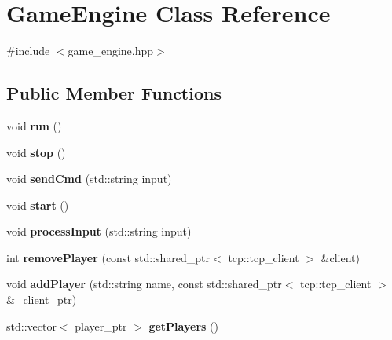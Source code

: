 \hypertarget{classGameEngine}{}\section{Game\+Engine Class Reference}
\label{classGameEngine}


{\ttfamily \#include $<$game\+\_\+engine.\+hpp$>$}

\subsection*{Public Member Functions}
\begin{DoxyCompactItemize}
\item 
void {\bfseries run} ()\hypertarget{classGameEngine_ab01970da2c68fefbf48b98c59d5627ae}{}\label{classGameEngine_ab01970da2c68fefbf48b98c59d5627ae}

\item 
void {\bfseries stop} ()\hypertarget{classGameEngine_a4a9ed9e9dfdfe675cba6e933a98a00fb}{}\label{classGameEngine_a4a9ed9e9dfdfe675cba6e933a98a00fb}

\item 
void {\bfseries send\+Cmd} (std\+::string input)\hypertarget{classGameEngine_aa4bbc86141b1279f0c6ec56fec9a91f5}{}\label{classGameEngine_aa4bbc86141b1279f0c6ec56fec9a91f5}

\item 
void {\bfseries start} ()\hypertarget{classGameEngine_a425ec68e14b2def17e162cbe3c6cfb13}{}\label{classGameEngine_a425ec68e14b2def17e162cbe3c6cfb13}

\item 
void {\bfseries process\+Input} (std\+::string input)\hypertarget{classGameEngine_a75cc7e6124f0405470e2144423f06444}{}\label{classGameEngine_a75cc7e6124f0405470e2144423f06444}

\item 
int {\bfseries remove\+Player} (const std\+::shared\+\_\+ptr$<$ tcp\+::tcp\+\_\+client $>$ \&client)\hypertarget{classGameEngine_a95999a2ca94e550764cc97f11bbb7e69}{}\label{classGameEngine_a95999a2ca94e550764cc97f11bbb7e69}

\item 
void {\bfseries add\+Player} (std\+::string name, const std\+::shared\+\_\+ptr$<$ tcp\+::tcp\+\_\+client $>$ \&\+\_\+client\+\_\+ptr)\hypertarget{classGameEngine_addd68ccd2a1c3e37996e12ac29a3b05e}{}\label{classGameEngine_addd68ccd2a1c3e37996e12ac29a3b05e}

\item 
std\+::vector$<$ player\+\_\+ptr $>$ {\bfseries get\+Players} ()\hypertarget{classGameEngine_a17f58e4209bc52641de09abe5d650bae}{}\label{classGameEngine_a17f58e4209bc52641de09abe5d650bae}


\end{DoxyCompactItemize}
